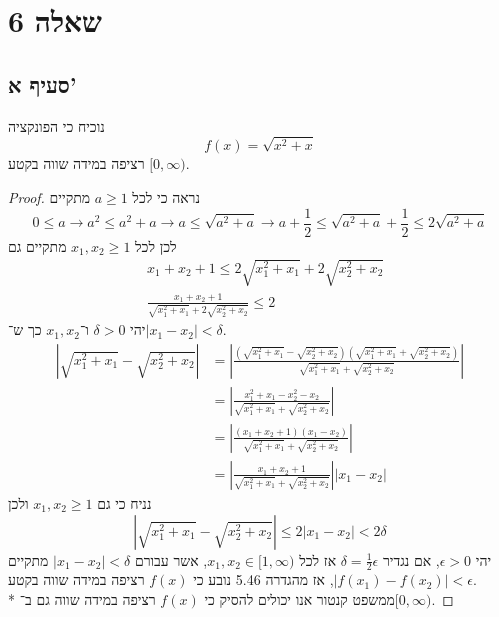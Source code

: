 \section{שאלה 6}
\subsection{סעיף א'}
נוכיח כי הפונקציה
\[
	f(x) = \sqrt{x^2 + x}
\]
רציפה במידה שווה בקטע $[0, \infty)$. %
\begin{proof}
	נראה כי לכל $a \ge 1$ מתקיים
	\[
		0 \le a
		\rightarrow a^2 \le a^2 + a
		\rightarrow a \le \sqrt{a^2 + a}
		\rightarrow a + \frac{1}{2} \le \sqrt{a^2 + a} + \frac{1}{2} \le 2 \sqrt{a^2 + a}
	\]
	לכן לכל $x_1, x_2 \ge 1$ מתקיים גם
	\begin{align*}
		& x_1 + x_2 + 1 \le 2 \sqrt{x_1^2 + x_1} + 2 \sqrt{x_2^2 + x_2} \\
		& \frac{x_1 + x_2 + 1}{ \sqrt{x_1^2 + x_1} + 2 \sqrt{x_2^2 + x_2}} \le 2
	\end{align*}
	יהי $\delta > 0$ ו־$x_1, x_2$ כך ש־$|x_1 - x_2| < \delta$.
	\begin{align*}
		\left\lvert \sqrt{x_1^2 + x_1} - \sqrt{x_2^2 + x_2} \right\rvert
		& = \left\lvert \frac{\left( \sqrt{x_1^2 + x_1} - \sqrt{x_2^2 + x_2} \right)\left( \sqrt{x_1^2 + x_1} + \sqrt{x_2^2 + x_2} \right)}
			{\sqrt{x_1^2 + x_1} + \sqrt{x_2^2 + x_2}} \right\rvert \\
		& = \left\lvert \frac{ x_1^2 + x_1 - x_2^2 - x_2 }{\sqrt{x_1^2 + x_1} + \sqrt{x_2^2 + x_2}} \right\rvert \\
		& = \left\lvert \frac{ (x_1 + x_2 + 1)(x_1 - x_2) }{\sqrt{x_1^2 + x_1} + \sqrt{x_2^2 + x_2}} \right\rvert \\
		& = \left\lvert \frac{ x_1 + x_2 + 1 }{\sqrt{x_1^2 + x_1} + \sqrt{x_2^2 + x_2}} \right\rvert |x_1 - x_2|
	\end{align*}
	נניח כי גם $x_1, x_2 \ge 1$ ולכן
	\[
		\left\lvert \sqrt{x_1^2 + x_1} - \sqrt{x_2^2 + x_2} \right\rvert \le 2 |x_1 - x_2| < 2 \delta
	\]
	יהי $\epsilon > 0$, אם נגדיר $\delta = \frac{1}{2} \epsilon$ אז לכל $x_1, x_2 \in [1, \infty)$, %
	אשר עבורם $|x_1 - x_2| < \delta$ מתקיים $|f(x_1) - f(x_2)| < \epsilon$,
	אז מהגדרה 5.46 נובע כי $f(x)$ רציפה במידה שווה בקטע. \\*
	ממשפט קנטור אנו יכולים להסיק כי $f(x)$ רציפה במידה שווה גם ב־$[0, \infty)$. %
\end{proof}


